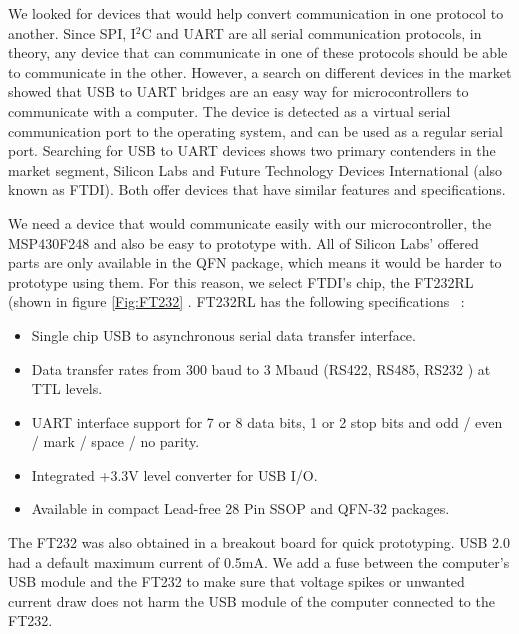 We looked for devices that would help convert communication in one protocol to another. Since SPI, I$^2$C and UART are all serial communication protocols, in theory, any device that can communicate in one of these protocols should be able to communicate in the other. However, a search on different devices in the market showed that USB to UART bridges are an easy way for microcontrollers to communicate with a computer. The device is detected as a virtual serial communication port to the operating system, and can be used as a regular serial port. Searching for USB to UART devices shows two primary contenders in the market segment, Silicon Labs and Future Technology Devices International (also known as FTDI). Both offer devices that have similar features and specifications. 

We need a device that would communicate easily with our microcontroller, the MSP430F248 and also be easy to prototype with. All of Silicon Labs' offered parts are only available in the QFN package, which means it would be harder to prototype using them. For this reason, we select FTDI's chip, the FT232RL (shown in figure \ref{Fig:FT232} \cite{Web:FTIMG}. FT232RL has the following specifications ~\cite{FT232Datasheet}:

\begin{itemize}
	\item Single chip USB to asynchronous serial data transfer interface.
	\item Data transfer rates from 300 baud to 3 Mbaud (RS422, RS485, RS232 ) at TTL levels.
	\item UART interface support for 7 or 8 data bits, 1 or 2 stop bits and odd / even / mark / space / no parity.
	\item Integrated +3.3V level converter for USB I/O.
	\item Available in compact Lead-free 28 Pin SSOP and QFN-32 packages.
\end{itemize}

The FT232 was also obtained in a breakout board for quick prototyping.
USB 2.0 had a default maximum current of 0.5mA. We add a fuse between the computer's USB module and the FT232 to make sure that voltage spikes or unwanted current draw does not harm the USB module of the computer connected to the FT232.


